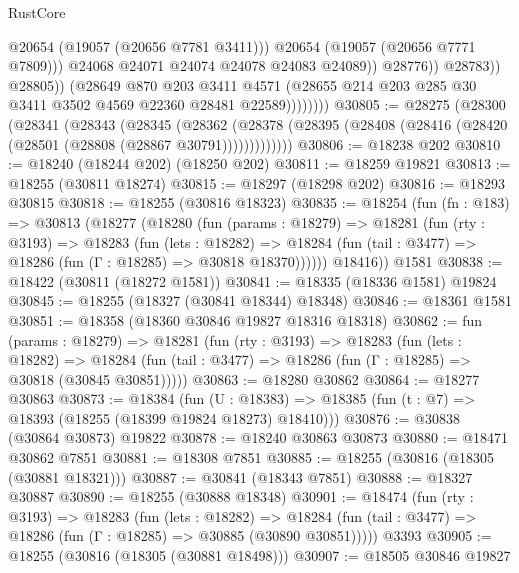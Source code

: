 \begin{lexlean}{RustCore}
\begin{coremodule}
                                    @20654
                                    (@19057 (@20656 @7781 @3411)))
                                  @20654
                                  (@19057 (@20656 @7771 @7809)))
                                @24068
                                @24071
                                @24074
                                @24078
                                @24083
                                @24089))
                            @28776))
                        @28783))
                    @28805))
                (@28649
                  @870
                  @203
                  @3411
                  @4571
                  (@28655 @214 @203 @285 @30 @3411 @3502 @4569 @22360 @28481 @22589))))))))
@30805 := @28275
    (@28300
      (@28341
        (@28343
          (@28345
            (@28362
              (@28378 (@28395 (@28408 (@28416 (@28420 (@28501 (@28808 (@28867 @30791)))))))))))))
@30806 := @18238 @202
@30810 := @18240 (@18244 @202) (@18250 @202)
@30811 := @18259 @19821
@30813 := @18255 (@30811 @18274)
@30815 := @18297 (@18298 @202)
@30816 := @18293 @30815
@30818 := @18255 (@30816 @18323)
@30835 := @18254
    (fun (fn : @183) =>
    @30813
      (@18277
        (@18280
          (fun (params : @18279) =>
          @18281
            (fun (rty : @3193) =>
            @18283
              (fun (lets : @18282) =>
              @18284 (fun (tail : @3477) => @18286 (fun (Γ : @18285) => @30818 @18370))))))
        @18416))
    @1581
@30838 := @18422 (@30811 (@18272 @1581))
@30841 := @18335 (@18336 @1581) @19824
@30845 := @18255 (@18327 (@30841 @18344) @18348)
@30846 := @18361 @1581
@30851 := @18358 (@18360 @30846 @19827 @18316 @18318)
@30862 := fun (params : @18279) =>
  @18281
    (fun (rty : @3193) =>
    @18283
      (fun (lets : @18282) =>
      @18284 (fun (tail : @3477) => @18286 (fun (Γ : @18285) => @30818 (@30845 @30851)))))
@30863 := @18280 @30862
@30864 := @18277 @30863
@30873 := @18384
    (fun (U : @18383) => @18385 (fun (t : @7) => @18393 (@18255 (@18399 @19824 @18273) @18410)))
@30876 := @30838 (@30864 @30873) @19822
@30878 := @18240 @30863 @30873
@30880 := @18471 @30862 @7851
@30881 := @18308 @7851
@30885 := @18255 (@30816 (@18305 (@30881 @18321)))
@30887 := @30841 (@18343 @7851)
@30888 := @18327 @30887
@30890 := @18255 (@30888 @18348)
@30901 := @18474
    (fun (rty : @3193) =>
    @18283
      (fun (lets : @18282) =>
      @18284 (fun (tail : @3477) => @18286 (fun (Γ : @18285) => @30885 (@30890 @30851)))))
    @3393
@30905 := @18255 (@30816 (@18305 (@30881 @18498)))
@30907 := @18505 @30846 @19827

\end{coremodule}
\end{lexlean}
